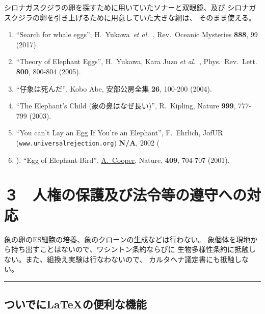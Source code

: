 \documentclass[11pt,a4j,dvipdfmx]{jarticle} 					%
\newcommand{\研究課題名}{象の卵}
\newcommand{\研究機関名}{逢坂大学}
\newcommand{\研究代表者氏名}{湯川秀樹}
\newcommand{\研究期間の最終元号年度}{11}  %
\newcommand{\paper}[6]{%
	\item ``#1'', #2, #3 {\bf #4}, #5 (#6).			%
}
\newcommand{\etal}{\textit{et al.\ }}
\newcommand{\yukawa}{H.~Yukawa}					%
\newcommand{\prl}{Phys.\ Rev.\ Lett.\ }		%
\begin{document}
	シロナガスクジラの卵を探すために用いていたソナーと双眼鏡、及び
	シロナガスクジラの卵を引き上げるために用意していた大きな網は、
	そのまま使える。
	\begin{enumerate}
		\paper{Search for whale eggs}{\yukawa\ \etal}{Rev.\ Oceanic Mysteries}{888}{99}{2017}
			\label{pub:whale}
				
		\paper{Theory of Elephant Eggs}{\yukawa, Kara Juzo \etal}{\prl}{800}{800-804}{2005}
			\label{pub:theoegg}
				
		\paper{仔象は死んだ}{Kobo Abe}{安部公房全集}{26}{100-200}{2004}
		
		\paper{The Elephant's Child (象の鼻はなぜ長い)}{R.~Kipling}{Nature}{999}{777-799}{2003}

		\paper{You can't Lay an Egg If You're an Elephant}{F.~Ehrlich}
			{JofUR\\({\tt www.universalrejection.org})}{{\bf N/A}}{2002}
		
		\item ``Egg of Elephant-Bird'', 
				\underline{A.~Cooper},
				Nature, {\bf 409}, 704-707 (2001).	%
	\end{enumerate}




\section{３　人権の保護及び法令等の遵守への対応}

	象の卵のES細胞の培養、象のクローンの生成などは行わない。
	象個体を現地から持ち出すことはないので、ワシントン条約ならびに
        生物多様性条約に抵触しない。また、組換え実験は行なわないので、
        カルタヘナ議定書にも抵触しない。

        \noindent
        \rule{\linewidth}{1pt}
        \linenumbers
        \subsection{ついでに\LaTeX の便利な機能}
\end{document}
